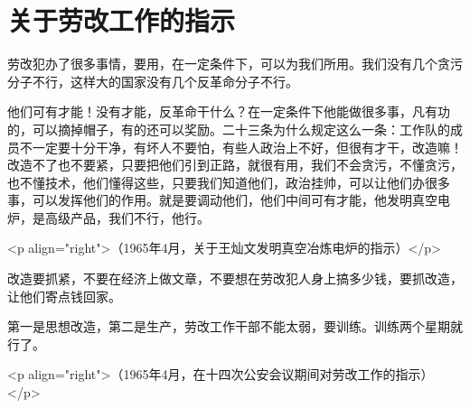 \section[关于劳改工作的指示（一九六五年四月）]{关于劳改工作的指示}


劳改犯办了很多事情，要用，在一定条件下，可以为我们所用。我们没有几个贪污分子不行，这样大的国家没有几个反革命分子不行。

他们可有才能！没有才能，反革命干什么？在一定条件下他能做很多事，凡有功的，可以摘掉帽子，有的还可以奖励。二十三条为什么规定这么一条：工作队的成员不一定要十分干净，有坏人不要怕，有些人政治上不好，但很有才干，改造嘛！改造不了也不要紧，只要把他们引到正路，就很有用，我们不会贪污，不懂贪污，也不懂技术，他们懂得这些，只要我们知道他们，政治挂帅，可以让他们办很多事，可以发挥他们的作用。就是要调动他们，他们中间可有才能，他发明真空电炉，是高级产品，我们不行，他行。

<p align="right">（1965年4月，关于王灿文发明真空冶炼电炉的指示）</p>

改造要抓紧，不要在经济上做文章，不要想在劳改犯人身上搞多少钱，要抓改造，让他们寄点钱回家。

第一是思想改造，第二是生产，劳改工作干部不能太弱，要训练。训练两个星期就行了。

<p align="right">（1965年4月，在十四次公安会议期间对劳改工作的指示）</p>


